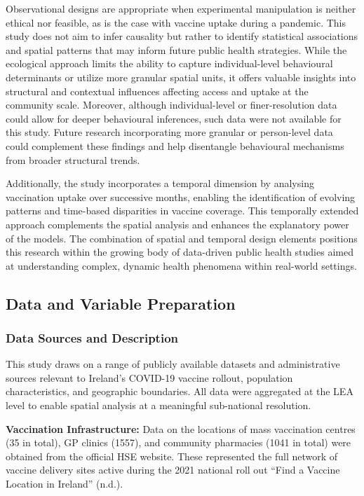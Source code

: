 \documentclass{article}
\begin{document}
Observational designs are appropriate when experimental manipulation is
neither ethical nor feasible, as is the case with vaccine uptake during
a pandemic. This study does not aim to infer causality but rather to
identify statistical associations and spatial patterns that may inform
future public health strategies. While the ecological approach limits
the ability to capture individual-level behavioural determinants or
utilize more granular spatial units, it offers valuable insights into
structural and contextual influences affecting access and uptake at the
community scale. Moreover, although individual-level or finer-resolution
data could allow for deeper behavioural inferences, such data were not
available for this study. Future research incorporating more granular or
person-level data could complement these findings and help disentangle
behavioural mechanisms from broader structural trends.

Additionally, the study incorporates a temporal dimension by analysing
vaccination uptake over successive months, enabling the identification
of evolving patterns and time-based disparities in vaccine coverage.
This temporally extended approach complements the spatial analysis and
enhances the explanatory power of the models. The combination of spatial
and temporal design elements positions this research within the growing
body of data-driven public health studies aimed at understanding
complex, dynamic health phenomena within real-world settings.

\subsection{Data and Variable
Preparation}\label{data-and-variable-preparation}

\subsubsection{Data Sources and
Description}\label{data-sources-and-description}

This study draws on a range of publicly available datasets and
administrative sources relevant to Ireland's COVID-19 vaccine rollout,
population characteristics, and geographic boundaries. All data were
aggregated at the LEA level to enable spatial analysis at a meaningful
sub-national resolution.

\textbf{Vaccination Infrastructure:} Data on the locations of mass
vaccination centres (35 in total), GP clinics (1557), and community
pharmacies (1041 in total) were obtained from the official HSE website.
These represented the full network of vaccine delivery sites active
during the 2021 national roll out {``Find a Vaccine Location in
{Ireland}''} (n.d.).
\end{document}
